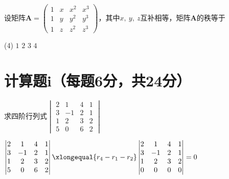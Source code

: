 \begin{exercise}
    设矩阵$\boldsymbol{A}=
    \begin{pmatrix}
        1 & x & x^2 & x^3\\
        1 & y & y^2 & y^3\\
        1 & z & z^2 & z^3
    \end{pmatrix}
    $，其中$x,\ y,\ z$互补相等，矩阵$\boldsymbol{A}$的秩等于\ans{}
    \begin{tasks}(4)
        \task $1$
        \task $2$
        \task $3$
        \task $4$
    \end{tasks}
\end{exercise}
\begin{solution}
    
\end{solution}

\section{计算题i（每题6分，共24分）}
\vspace{-1em}
\begin{exercise}
求四阶行列式$
\begin{vmatrix}
    2 & 1 & 4 & 1\\
    3 & -1 & 2 & 1\\
    1 & 2 & 3 & 2\\
    5 & 0 & 6 & 2
\end{vmatrix}
$
\end{exercise}
\begin{solution}
$
\begin{aligned}
    \begin{vmatrix}
        2 & 1 & 4 & 1\\
        3 & -1 & 2 & 1\\
        1 & 2 & 3 & 2\\
        5 & 0 & 6 & 2
    \end{vmatrix}\xlongequal{r_4-r_1-r_2}
    \begin{vmatrix}
        2 & 1 & 4 & 1\\
        3 & -1 & 2 & 1\\
        1 & 2 & 3 & 2\\
        0 & 0 & 0 & 0
    \end{vmatrix}=0
\end{aligned}
$
\end{solution}

